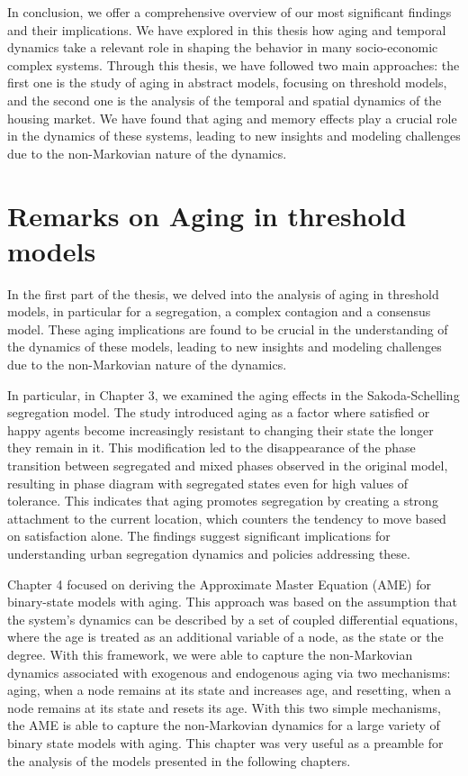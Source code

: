 In conclusion, we offer a comprehensive overview of our most
significant findings and their implications. We have explored in this thesis how aging and temporal dynamics take a relevant role in shaping the behavior in many socio-economic complex systems. Through this thesis, we have followed two main approaches: the first one is the study of aging in abstract models, focusing on threshold models, and the second one is the analysis of the temporal and spatial dynamics of the housing market. We have found that aging and memory effects play a crucial role in the dynamics of these systems, leading to new insights and modeling challenges due to the non-Markovian nature of the dynamics.

\section{Remarks on Aging in threshold models \label{sec:aging_threshold_models}}

In the first part of the thesis, we delved into the analysis of aging in threshold models, in particular for a segregation, a complex contagion and a consensus model. These aging implications are found to be crucial in the understanding of the dynamics of these models, leading to new insights and modeling challenges due to the non-Markovian nature of the dynamics.

In particular, in Chapter 3, we examined the aging effects in the Sakoda-Schelling segregation model. The study introduced aging as a factor where satisfied or happy agents become increasingly resistant to changing their state the longer they remain in it. This modification led to the disappearance of the phase transition between segregated and mixed phases observed in the original model, resulting in phase diagram with segregated states even for high values of tolerance. This indicates that aging promotes segregation by creating a strong attachment to the current location, which counters the tendency to move based on satisfaction alone. The findings suggest significant implications for understanding urban segregation dynamics and policies addressing these.

Chapter 4 focused on deriving the Approximate Master Equation (AME) for binary-state models with aging. This approach was based on the assumption that the system's dynamics can be described by a set of coupled differential equations, where the age is treated as an additional variable of a node, as the state or the degree. With this framework, we were able to capture the non-Markovian dynamics associated with exogenous and endogenous aging via two mechanisms: aging, when a node remains at its state and increases age, and resetting, when a node remains at its state and resets its age. With this two simple mechanisms, the AME is able to capture the non-Markovian dynamics for a large variety of binary state models with aging. This chapter was very useful as a preamble for the analysis of the models presented in the following chapters.

